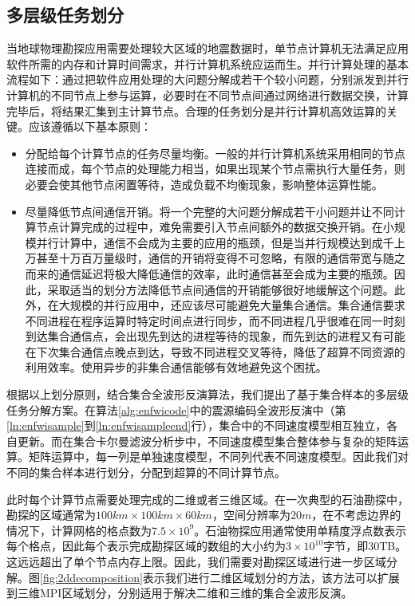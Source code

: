 \documentclass[degree=doctor]{thuthesis}
\begin{document}
\subsection{多层级任务划分} %
\label{sub:多层级任务划分}
当地球物理勘探应用需要处理较大区域的地震数据时，单节点计算机无法满足应用软件所需的内存和计算时间需求，并行计算机系统应运而生。并行计算处理的基本流程如下：通过把软件应用处理的大问题分解成若干个较小问题，分别派发到并行计算机的不同节点上参与运算，必要时在不同节点间通过网络进行数据交换，计算完毕后，将结果汇集到主计算节点。合理的任务划分是并行计算机高效运算的关键。应该遵循以下基本原则：
\begin{itemize}
  \item 分配给每个计算节点的任务尽量均衡。一般的并行计算机系统采用相同的节点连接而成，每个节点的处理能力相当，如果出现某个节点需执行大量任务，则必要会使其他节点闲置等待，造成负载不均衡现象，影响整体运算性能。
  \item 尽量降低节点间通信开销。将一个完整的大问题分解成若干小问题并让不同计算节点计算完成的过程中，难免需要引入节点间额外的数据交换开销。在小规模并行计算中，通信不会成为主要的应用的瓶颈，但是当并行规模达到成千上万甚至十万百万量级时，通信的开销将变得不可忽略，有限的通信带宽与随之而来的通信延迟将极大降低通信的效率，此时通信甚至会成为主要的瓶颈。因此，采取适当的划分方法降低节点间通信的开销能够很好地缓解这个问题。此外，在大规模的并行应用中，还应该尽可能避免大量集合通信。集合通信要求不同进程在程序运算时特定时间点进行同步，而不同进程几乎很难在同一时刻到达集合通信点，会出现先到达的进程等待的现象，而先到达的进程又有可能在下次集合通信点晚点到达，导致不同进程交叉等待，降低了超算不同资源的利用效率。使用异步的非集合通信能够有效地避免这个困扰。
\end{itemize}

根据以上划分原则，结合集合全波形反演算法，我们提出了基于集合样本的多层级任务分解方案。在算法\ref{alg:enfwicode}中的震源编码全波形反演中（第\ref{ln:enfwisample}到\ref{ln:enfwisampleend}行），集合中的不同速度模型相互独立，各自更新。而在集合卡尔曼滤波分析步中，不同速度模型集合整体参与复杂的矩阵运算。矩阵运算中，每一列是单独速度模型，不同列代表不同速度模型。因此我们对不同的集合样本进行划分，分配到超算的不同计算节点。

此时每个计算节点需要处理完成的二维或者三维区域。在一次典型的石油勘探中，勘探的区域通常为$100km\times100km\times60km$，空间分辨率为$20m$，在不考虑边界的情况下，计算网格的格点数为$7.5\times10^9$。石油物探应用通常使用单精度浮点数表示每个格点，因此每个表示完成勘探区域的数组的大小约为$3\times10^10$字节，即30TB。这远远超出了单个节点内存上限。因此，我们需要对勘探区域进行进一步区域分解。图\ref{fig:2ddecomposition}表示我们进行二维区域划分的方法，该方法可以扩展到三维MPI区域划分，分别适用于解决二维和三维的集合全波形反演。
\end{document}
